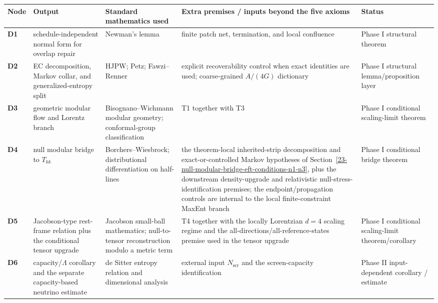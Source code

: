 \begingroup
\scriptsize
{\def\LTcaptype{none}
\setlength{\tabcolsep}{2pt}
\begin{longtable}[]{@{}>{\RaggedRight\arraybackslash}p{}>{\RaggedRight\arraybackslash}p{}>{\RaggedRight\arraybackslash}p{}>{\RaggedRight\arraybackslash}p{}>{\RaggedRight\arraybackslash}p{}@{}}
\toprule\noalign{}
Node & Output & Standard mathematics used & Extra premises / inputs beyond the five axioms & Status \\
\midrule\noalign{}
\endhead
\bottomrule\noalign{}
\endlastfoot
\textbf{D1} & schedule-independent normal form for overlap repair & Newman's lemma & finite patch net, termination, and local confluence & Phase I structural theorem \\
\textbf{D2} & EC decomposition, Markov collar, and generalized-entropy split & HJPW; Petz; Fawzi--Renner & explicit recoverability control when exact identities are used; coarse-grained \(A/(4G)\) dictionary & Phase I structural lemma/proposition layer \\
\textbf{D3} & geometric modular flow and Lorentz branch & Bisognano--Wichmann modular geometry; conformal-group classification & T1 together with T3 & Phase I conditional scaling-limit theorem \\
\textbf{D4} & null modular bridge to \(T_{kk}\) & Borchers--Wiesbrock; distributional differentiation on half-lines & the theorem-local inherited-strip decomposition and exact-or-controlled Markov hypotheses of Section~\ref{23-null-modular-bridge-eft-conditions-n1-n3}, plus the downstream density-upgrade and relativistic null-stress-identification premises; the endpoint/propagation controls are internal to the local finite-constraint MaxEnt branch & Phase I conditional bridge theorem \\
\textbf{D5} & Jacobson-type rest-frame relation plus the conditional tensor upgrade & Jacobson small-ball mathematics; null-to-tensor reconstruction modulo a metric term & T4 together with the locally Lorentzian \(d=4\) scaling regime and the all-directions/all-reference-states premise used in the tensor upgrade & Phase I conditional scaling-limit theorem/corollary \\
\textbf{D6} & capacity/\(\Lambda\) corollary and the separate capacity-based neutrino estimate & de Sitter entropy relation and dimensional analysis & external input \(N_{\mathrm{scr}}\) and the screen-capacity identification & Phase II input-dependent corollary / estimate \\

\end{longtable}}
